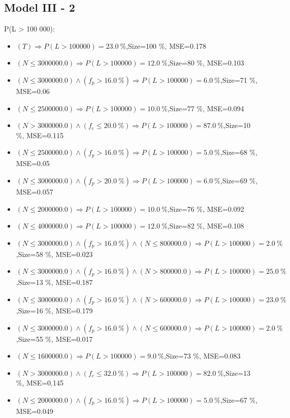 \documentclass[numbered]{CSL}
\begin{document}
\subsection{Model III - 2}
P(L > 100 000):
\begin{itemize}
\item $(T) \Rightarrow P(L > 100 000) = 23.0~\%$,\hfill Size=100 \%, MSE=0.178
\item $(N \leq 3000000.0) \Rightarrow P(L > 100 000) = 12.0~\%$,\hfill Size=80 \%, MSE=0.103
\item $(N \leq 3000000.0) \land (f_p > 16.0~\%) \Rightarrow P(L > 100 000) = 6.0~\%$,\hfill Size=71 \%, MSE=0.06
\item $(N \leq 2500000.0) \Rightarrow P(L > 100 000) = 10.0~\%$,\hfill Size=77 \%, MSE=0.094
\item $(N > 3000000.0) \land (f_c \leq 20.0~\%) \Rightarrow P(L > 100 000) = 87.0~\%$,\hfill Size=10 \%, MSE=0.115
\item $(N \leq 2500000.0) \land (f_p > 16.0~\%) \Rightarrow P(L > 100 000) = 5.0~\%$,\hfill Size=68 \%, MSE=0.05
\item $(N \leq 3000000.0) \land (f_p > 20.0~\%) \Rightarrow P(L > 100 000) = 6.0~\%$,\hfill Size=69 \%, MSE=0.057
\item $(N \leq 2000000.0) \Rightarrow P(L > 100 000) = 10.0~\%$,\hfill Size=76 \%, MSE=0.092
\item $(N \leq 4000000.0) \Rightarrow P(L > 100 000) = 12.0~\%$,\hfill Size=82 \%, MSE=0.108
\item $(N \leq 3000000.0) \land (f_p > 16.0~\%) \land (N \leq 800000.0) \Rightarrow P(L > 100 000) = 2.0~\%$,\hfill Size=58 \%, MSE=0.023
\item $(N \leq 3000000.0) \land (f_p > 16.0~\%) \land (N > 800000.0) \Rightarrow P(L > 100 000) = 25.0~\%$,\hfill Size=13 \%, MSE=0.187
\item $(N \leq 3000000.0) \land (f_p > 16.0~\%) \land (N > 600000.0) \Rightarrow P(L > 100 000) = 23.0~\%$,\hfill Size=16 \%, MSE=0.179
\item $(N \leq 3000000.0) \land (f_p > 16.0~\%) \land (N \leq 600000.0) \Rightarrow P(L > 100 000) = 2.0~\%$,\hfill Size=55 \%, MSE=0.017
\item $(N \leq 1600000.0) \Rightarrow P(L > 100 000) = 9.0~\%$,\hfill Size=73 \%, MSE=0.083
\item $(N > 3000000.0) \land (f_c \leq 32.0~\%) \Rightarrow P(L > 100 000) = 82.0~\%$,\hfill Size=13 \%, MSE=0.145
\item $(N \leq 2000000.0) \land (f_p > 16.0~\%) \Rightarrow P(L > 100 000) = 5.0~\%$,\hfill Size=67 \%, MSE=0.049

\end{itemize}
\end{document}

